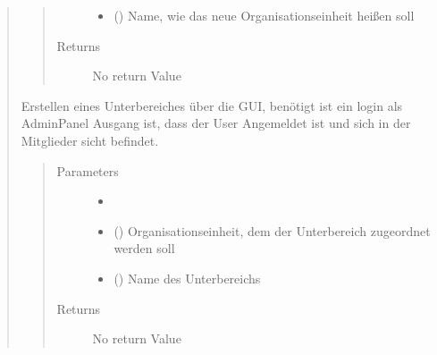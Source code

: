 \documentclass[letterpaper,10pt,english]{sphinxmanual}
\begin{document}
\begin{quote}
\begin{fulllineitems}
\begin{quote}
\begin{description}
\begin{itemize}
\item {} 
 () \textendash{} Name, wie das neue Organisationseinheit heißen soll

\end{itemize}

\item[{Returns}] \leavevmode
No return Value

\end{description}\end{quote}

\end{fulllineitems}



\begin{fulllineitems}
Erstellen eines Unterbereiches über die GUI, benötigt ist ein login als AdminPanel
Ausgang ist, dass der User Angemeldet ist und sich in der Mitglieder sicht
befindet.
\begin{quote}\begin{description}
\item[{Parameters}] \leavevmode\begin{itemize}
\item {} 
 \textendash{} 

\item {} 
 () \textendash{} Organisationseinheit, dem der Unterbereich zugeordnet werden soll

\item {} 
 () \textendash{} Name des Unterbereichs

\end{itemize}

\item[{Returns}] \leavevmode
No return Value

\end{description}\end{quote}

\end{fulllineitems}

\end{quote}
\end{document}
